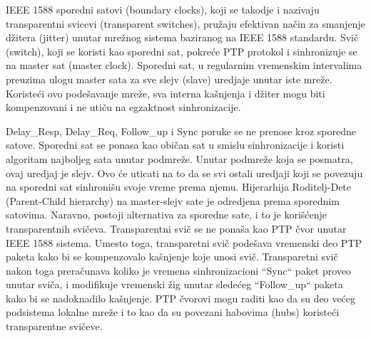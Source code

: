 \documentclass[a4paper,12pt, master]{etf}
\begin{document}
	
	IEEE 1588 sporedni satovi (boundary clocks), koji se takodje i nazivaju 
	transparentni svicevi (transparent switches), pru\v{z}aju efektivan na\v{c}in za 
	smanjenje d\v{z}itera (jitter) unutar mre\v{z}nog sistema baziranog na IEEE 1588 
	standardu. Svi\v{c} (switch), koji se koristi kao sporedni sat, pokre\'{c}e PTP protokol i 
	sinhronizuje se na master sat (master clock). Sporedni sat, u regularnim vremenskim intervalima
	preuzima ulogu master sata za sve slejv (slave) uredjaje unutar iste mre\v{z}e. 
    Koriste\'{c}i ovo pode\v{s}avanje mre\v{z}e, sva interna ka\v{s}njenja i d\v{z}iter mogu biti 
    kompenzovani i ne uti\v{c}u na egzaktnost sinhronizacije.
	
	Delay\_Resp, Delay\_Req, Follow\_up i Sync poruke se ne prenose kroz sporedne satove. 
	Sporedni sat se ponasa kao obi\v{c}an sat u smislu sinhronizacije i koristi algoritam 
	najboljeg sata unutar podmre\v{z}e. Unutar podmre\v{z}e koja se posmatra, ovaj uredjaj je slejv. 
	Ovo \'{c}e uticati na to da se svi ostali uredjaji koji se povezuju na sporedni sat 
	sinhroni\v{s}u svoje vreme prema njemu. Hijerarhija Roditelj-Dete (Parent-Child hierarchy) na 
	master-slejv sate je odredjena prema sporednim satovima. Naravno, postoji alternativa za sporedne sate, 
	i to je kori\v{s}\'{c}enje transparentnih svi\v{c}eva. Transparentni svi\v{c} se ne pona\v{s}a kao 
	PTP \v{c}vor unutar IEEE 1588 sistema. Umesto toga, transparetni svi\v{c} pode\v{s}ava 
	vremenski deo PTP paketa kako bi se kompenzovalo ka\v{s}njenje koje unosi svi\v{c}. Transparetni 
	svi\v{c} nakon toga prera\v{c}unava koliko je vremena sinhronizacioni ``Sync`` paket proveo unutar 
	svi\v{c}a, i modifikuje vremenski \v{z}ig unutar slede\'{c}eg ``Follow\_up`` paketa kako bi se 
	nadoknadilo ka\v{s}njenje. PTP \v{c}vorovi mogu raditi kao da su deo ve\'{c}eg podsistema lokalne mre\v{z}e
	i to kao da su povezani habovima (hubs) koriste\'{c}i transparentne svi\v{c}eve.
\end{document}
